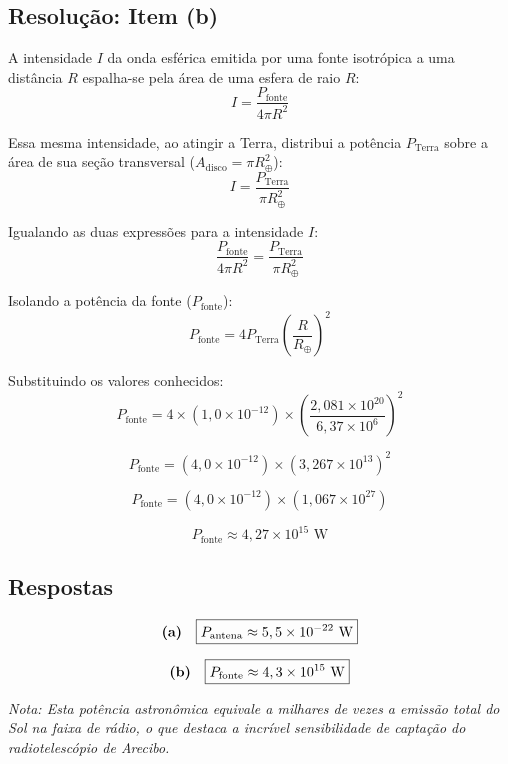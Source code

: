 \documentclass[12pt,a4paper]{article}
\begin{document}

\subsection*{Resolução: Item (b)}

A intensidade $I$ da onda esférica emitida por uma fonte isotrópica a uma distância $R$ espalha-se pela área de uma esfera de raio $R$:
\[
I = \frac{P_{\text{fonte}}}{4\pi R^2}
\]

Essa mesma intensidade, ao atingir a Terra, distribui a potência $P_{\text{Terra}}$ sobre a área de sua seção transversal ($A_{\text{disco}} = \pi R_{\oplus}^2$):
\[
I = \frac{P_{\text{Terra}}}{\pi R_{\oplus}^2}
\]

Igualando as duas expressões para a intensidade $I$:
\[
\frac{P_{\text{fonte}}}{4\pi R^2} = \frac{P_{\text{Terra}}}{\pi R_{\oplus}^2}
\]

Isolando a potência da fonte ($P_{\text{fonte}}$):
\[
P_{\text{fonte}} = 4 P_{\text{Terra}} \left( \frac{R}{R_{\oplus}} \right)^2
\]

Substituindo os valores conhecidos:
\[
P_{\text{fonte}} = 4 \times (1,0 \times 10^{-12}) \times \left( \frac{2,081 \times 10^{20}}{6,37 \times 10^6} \right)^2
\]

\[
P_{\text{fonte}} = (4,0 \times 10^{-12}) \times (3,267 \times 10^{13})^2
\]

\[
P_{\text{fonte}} = (4,0 \times 10^{-12}) \times (1,067 \times 10^{27})
\]

\[
P_{\text{fonte}} \approx 4,27 \times 10^{15} \text{ W}
\]


\subsection*{Respostas}

\[
\text{\textbf{(a)}} \quad \boxed{P_{\text{antena}} \approx 5,5 \times 10^{-22} \text{ W}}
\]

\[
\text{\textbf{(b)}} \quad \boxed{P_{\text{fonte}} \approx 4,3 \times 10^{15} \text{ W}}
\]

\vspace{0.3cm}
\noindent\textit{Nota: Esta potência astronômica equivale a milhares de vezes a emissão total do Sol na faixa de rádio, o que destaca a incrível sensibilidade de captação do radiotelescópio de Arecibo.}
\end{document}
